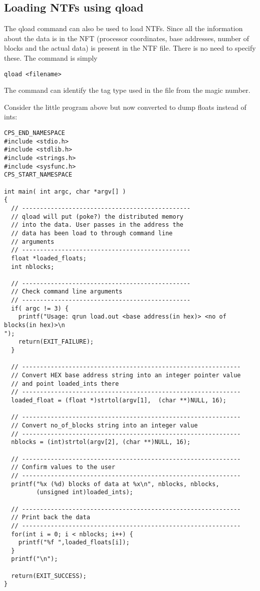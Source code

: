 \subsection{Loading NTFs using qload}
The qload command can also be used to load NTFs. Since all the information
about the data is in the NFT (processor coordinates, base addresses, number of blocks and the actual data) is present in the NTF file. There is no need
to specify these. The command is simply
\begin{verbatim}
qload <filename>
\end{verbatim}
The command can identify the tag type used in the file from the magic number.

Consider the little program above but now converted to dump floats instead 
of ints:
{\scriptsize
\begin{verbatim}
CPS_END_NAMESPACE
#include <stdio.h>
#include <stdlib.h>
#include <strings.h>
#include <sysfunc.h>
CPS_START_NAMESPACE

int main( int argc, char *argv[] )
{
  // -----------------------------------------------
  // qload will put (poke?) the distributed memory
  // into the data. User passes in the address the
  // data has been load to through command line
  // arguments
  // -----------------------------------------------
  float *loaded_floats;
  int nblocks;

  // -----------------------------------------------
  // Check command line arguments
  // -----------------------------------------------
  if( argc != 3) {
    printf("Usage: qrun load.out <base address(in hex)> <no of blocks(in hex)>\n
");
    return(EXIT_FAILURE);
  }

  // -------------------------------------------------------------
  // Convert HEX base address string into an integer pointer value
  // and point loaded_ints there
  // -------------------------------------------------------------
  loaded_float = (float *)strtol(argv[1],  (char **)NULL, 16);

  // -------------------------------------------------------------
  // Convert no_of_blocks string into an integer value
  // -------------------------------------------------------------
  nblocks = (int)strtol(argv[2], (char **)NULL, 16);

  // -------------------------------------------------------------
  // Confirm values to the user
  // -------------------------------------------------------------
  printf("%x (%d) blocks of data at %x\n", nblocks, nblocks,
         (unsigned int)loaded_ints);

  // -------------------------------------------------------------
  // Print back the data
  // -------------------------------------------------------------
  for(int i = 0; i < nblocks; i++) {
    printf("%f ",loaded_floats[i]);
  }
  printf("\n");

  return(EXIT_SUCCESS);
}
\end{verbatim}
}

